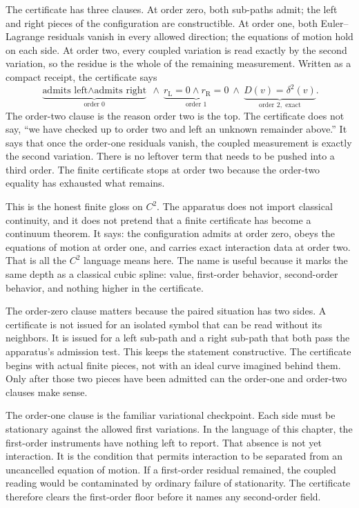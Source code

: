 The certificate has three clauses. At order zero, both sub-paths admit; the
left and right pieces of the configuration are constructible. At order one, both
Euler--Lagrange residuals vanish in every allowed direction; the equations of
motion hold on each side. At order two, every coupled variation is read exactly
by the second variation, so the residue is the whole of the remaining
measurement. Written as a compact receipt, the certificate says
\[
  \underbrace{\text{admits left} \wedge \text{admits right}}_{\text{order } 0}
  \ \wedge\
  \underbrace{r_{\mathrm{L}} = 0 \wedge r_{\mathrm{R}} = 0}_{\text{order } 1}
  \ \wedge\
  \underbrace{D(v) = \delta^2(v)}_{\text{order } 2, \text{ exact}}.
\]
The order-two clause is the reason order two is the top. The certificate does
not say, ``we have checked up to order two and left an unknown remainder
above.'' It says that once the order-one residuals vanish, the coupled
measurement is exactly the second variation. There is no leftover term that
needs to be pushed into a third order. The finite certificate stops at order
two because the order-two equality has exhausted what remains.

This is the honest finite gloss on \(C^2\). The apparatus does not import
classical continuity, and it does not pretend that a finite certificate has
become a continuum theorem. It says: the configuration admits at order zero,
obeys the equations of motion at order one, and carries exact interaction data
at order two. That is all the \(C^2\) language means here. The name is useful
because it marks the same depth as a classical cubic spline: value,
first-order behavior, second-order behavior, and nothing higher in the
certificate.

The order-zero clause matters because the paired situation has two sides. A
certificate is not issued for an isolated symbol that can be read without its
neighbors. It is issued for a left sub-path and a right sub-path that both pass
the apparatus's admission test. This keeps the statement constructive. The
certificate begins with actual finite pieces, not with an ideal curve imagined
behind them. Only after those two pieces have been admitted can the order-one
and order-two clauses make sense.

The order-one clause is the familiar variational checkpoint. Each side must be
stationary against the allowed first variations. In the language of this
chapter, the first-order instruments have nothing left to report. That absence
is not yet interaction. It is the condition that permits interaction to be
separated from an uncancelled equation of motion. If a first-order residual
remained, the coupled reading would be contaminated by ordinary failure of
stationarity. The certificate therefore clears the first-order floor before it
names any second-order field.

